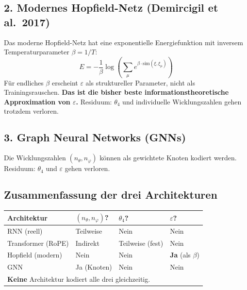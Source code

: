 \subsection*{2. Modernes Hopfield-Netz (Demircigil et al.\ 2017)}

Das moderne Hopfield-Netz hat eine exponentielle Energiefunktion mit
inversem Temperaturparameter $\beta = 1/T$:
\begin{equation}
  E = -\frac{1}{\beta}\log\!\left(\sum_\mu e^{\beta\cdot\text{sim}(\xi,\xi_\mu)}\right)
  \tag{243.13}
\end{equation}
Für endliches $\beta$ erscheint $\varepsilon$ als struktureller Parameter,
nicht als Trainingsrauschen. \textbf{Das ist die bisher beste
informationstheoretische Approximation von $\varepsilon$.}
Residuum: $\theta_4$ und individuelle Wicklungszahlen gehen trotzdem verloren.

\subsection*{3. Graph Neural Networks (GNNs)}

Die Wicklungszahlen $(n_\theta,n_\varphi)$ können als gewichtete Knoten
kodiert werden. Residuum: $\theta_4$ und $\varepsilon$ gehen verloren.

\subsection*{Zusammenfassung der drei Architekturen}

\begin{center}
\renewcommand{\arraystretch}{1.3}
{\small
\begin{tabular}{p{3.5cm}p{3cm}p{3cm}p{3cm}}
\toprule
\textbf{Architektur} & \textbf{$(n_\theta,n_\varphi)$?} & \textbf{$\theta_4$?} & \textbf{$\varepsilon$?} \\
\midrule
RNN (reell) & Teilweise & Nein & Nein \\
Transformer (RoPE) & Indirekt & Teilweise (fest) & Nein \\
Hopfield (modern) & Nein & Nein & \textbf{Ja} (als $\beta$) \\
GNN & Ja (Knoten) & Nein & Nein \\
\midrule
\multicolumn{4}{l}{\textbf{Keine} Architektur kodiert alle drei gleichzeitig.} \\
\bottomrule
\end{tabular}
}
\end{center}

